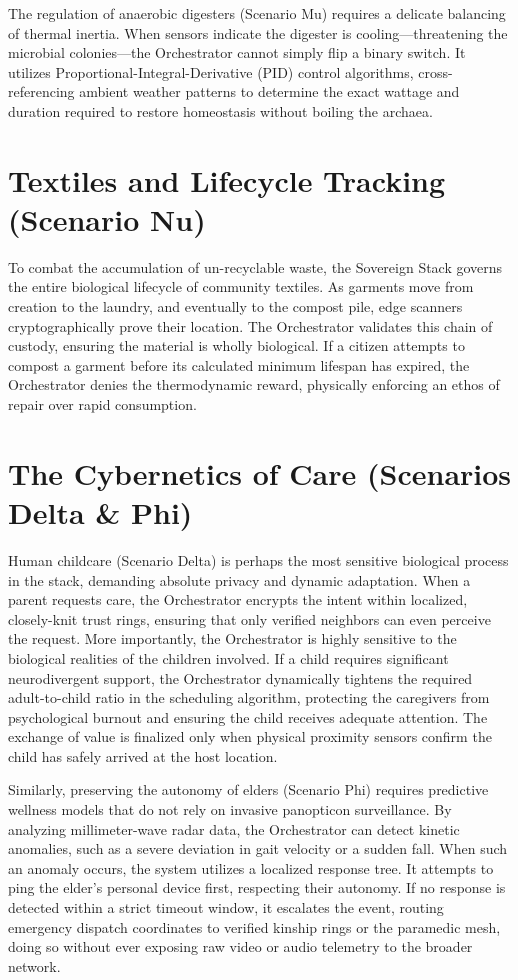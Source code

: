 The regulation of anaerobic digesters (Scenario Mu) requires a delicate balancing of thermal inertia. When sensors indicate the digester is cooling—threatening the microbial colonies—the Orchestrator cannot simply flip a binary switch. It utilizes Proportional-Integral-Derivative (PID) control algorithms, cross-referencing ambient weather patterns to determine the exact wattage and duration required to restore homeostasis without boiling the archaea.

\section{Textiles and Lifecycle Tracking (Scenario Nu)}
To combat the accumulation of un-recyclable waste, the Sovereign Stack governs the entire biological lifecycle of community textiles. As garments move from creation to the laundry, and eventually to the compost pile, edge scanners cryptographically prove their location. The Orchestrator validates this chain of custody, ensuring the material is wholly biological. If a citizen attempts to compost a garment before its calculated minimum lifespan has expired, the Orchestrator denies the thermodynamic reward, physically enforcing an ethos of repair over rapid consumption.

\section{The Cybernetics of Care (Scenarios Delta \& Phi)}
Human childcare (Scenario Delta) is perhaps the most sensitive biological process in the stack, demanding absolute privacy and dynamic adaptation. When a parent requests care, the Orchestrator encrypts the intent within localized, closely-knit trust rings, ensuring that only verified neighbors can even perceive the request. More importantly, the Orchestrator is highly sensitive to the biological realities of the children involved. If a child requires significant neurodivergent support, the Orchestrator dynamically tightens the required adult-to-child ratio in the scheduling algorithm, protecting the caregivers from psychological burnout and ensuring the child receives adequate attention. The exchange of value is finalized only when physical proximity sensors confirm the child has safely arrived at the host location.

Similarly, preserving the autonomy of elders (Scenario Phi) requires predictive wellness models that do not rely on invasive panopticon surveillance. By analyzing millimeter-wave radar data, the Orchestrator can detect kinetic anomalies, such as a severe deviation in gait velocity or a sudden fall. When such an anomaly occurs, the system utilizes a localized response tree. It attempts to ping the elder's personal device first, respecting their autonomy. If no response is detected within a strict timeout window, it escalates the event, routing emergency dispatch coordinates to verified kinship rings or the paramedic mesh, doing so without ever exposing raw video or audio telemetry to the broader network.
